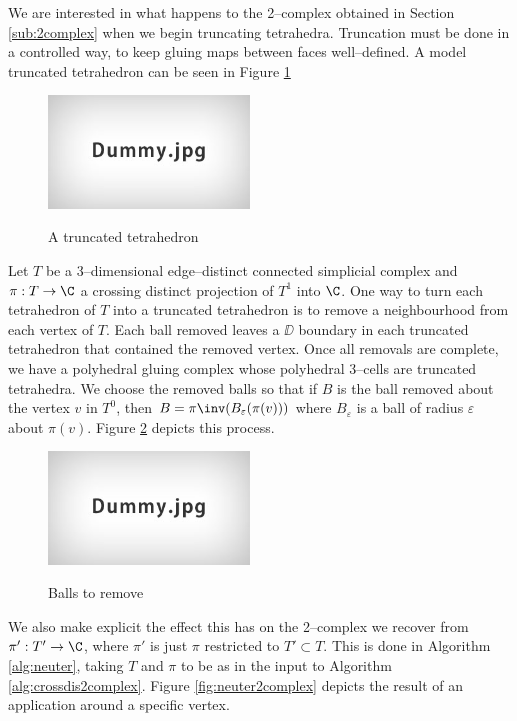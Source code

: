 We are interested in what happens to the 2--complex obtained in Section \ref{sub:2complex} when we begin truncating tetrahedra.
Truncation must be done in a controlled way, to keep gluing maps between faces well--defined.
A model truncated tetrahedron can be seen in Figure \ref{fig:truncttet}

\begin{figure}
	\centering
	\captionsetup{justification=centering}
	\caption{A truncated tetrahedron}
	\includegraphics[height=3cm]{figures/dummy.jpg}
	\label{fig:truncttet}
\end{figure}

Let $T$ be a 3--dimensional edge--distinct connected simplicial complex and $\pi:T\to\C$ a crossing distinct projection of $T^1$ into $\C$.
One way to turn each tetrahedron of $T$ into a truncated tetrahedron is to remove a neighbourhood from each vertex of $T$.
Each ball removed leaves a $\DD$ boundary in each truncated tetrahedron that contained the removed vertex.
Once all removals are complete, we have a polyhedral gluing complex whose polyhedral 3--cells are truncated tetrahedra.
We choose the removed balls so that if $B$ is the ball removed about the vertex $v$ in $T^0$, then $B = \pi\inv(B_\varepsilon(\pi(v)))$ where $B_\varepsilon$ is a ball of radius $\varepsilon$ about $\pi(v)$.
Figure \ref{fig:neuter} depicts this process.

\begin{figure}
	\centering
	\captionsetup{justification=centering}
	\caption{Balls to remove}
	\includegraphics[height=3cm]{figures/dummy.jpg}
	\label{fig:neuter}
\end{figure}

We also make explicit the effect this has on the 2--complex we recover from $\pi':T'\to\C$, where $\pi'$ is just $\pi$ restricted to $T'\subset T$.
This is done in Algorithm \ref{alg:neuter}, taking $T$ and $\pi$ to be as in the input to Algorithm \ref{alg:crossdis2complex}.
Figure \ref{fig:neuter2complex} depicts the result of an application around a specific vertex.

